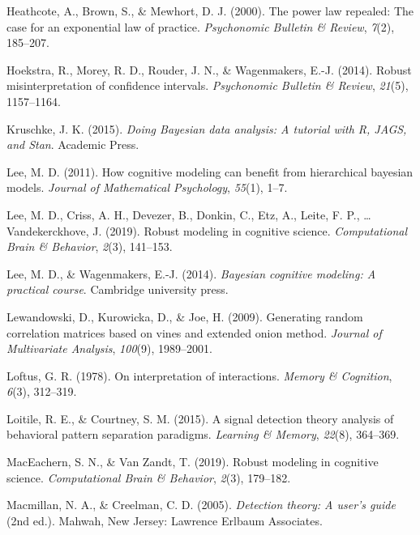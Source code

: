 \documentclass[
  english,
  ,man,floatsintext]{apa6}
\begin{document}
\leavevmode\hypertarget{ref-heathcote2000power}{}%
Heathcote, A., Brown, S., \& Mewhort, D. J. (2000). The power law repealed: The case for an exponential law of practice. \emph{Psychonomic Bulletin \& Review}, \emph{7}(2), 185--207.

\leavevmode\hypertarget{ref-HoekstraEtAl2014}{}%
Hoekstra, R., Morey, R. D., Rouder, J. N., \& Wagenmakers, E.-J. (2014). Robust misinterpretation of confidence intervals. \emph{Psychonomic Bulletin \& Review}, \emph{21}(5), 1157--1164.

\leavevmode\hypertarget{ref-Kruschke2015}{}%
Kruschke, J. K. (2015). \emph{Doing Bayesian data analysis: A tutorial with R, JAGS, and Stan}. Academic Press.

\leavevmode\hypertarget{ref-lee2011cognitive}{}%
Lee, M. D. (2011). How cognitive modeling can benefit from hierarchical bayesian models. \emph{Journal of Mathematical Psychology}, \emph{55}(1), 1--7.

\leavevmode\hypertarget{ref-LeeEtAl2019}{}%
Lee, M. D., Criss, A. H., Devezer, B., Donkin, C., Etz, A., Leite, F. P., \ldots{} Vandekerckhove, J. (2019). Robust modeling in cognitive science. \emph{Computational Brain \& Behavior}, \emph{2}(3), 141--153.

\leavevmode\hypertarget{ref-lee2014bayesian}{}%
Lee, M. D., \& Wagenmakers, E.-J. (2014). \emph{Bayesian cognitive modeling: A practical course}. Cambridge university press.

\leavevmode\hypertarget{ref-lewandowski2009generating}{}%
Lewandowski, D., Kurowicka, D., \& Joe, H. (2009). Generating random correlation matrices based on vines and extended onion method. \emph{Journal of Multivariate Analysis}, \emph{100}(9), 1989--2001.

\leavevmode\hypertarget{ref-Loftus1978}{}%
Loftus, G. R. (1978). On interpretation of interactions. \emph{Memory \& Cognition}, \emph{6}(3), 312--319.

\leavevmode\hypertarget{ref-LoitileAndCourtney2015}{}%
Loitile, R. E., \& Courtney, S. M. (2015). A signal detection theory analysis of behavioral pattern separation paradigms. \emph{Learning \& Memory}, \emph{22}(8), 364--369.

\leavevmode\hypertarget{ref-MacEachernAndVanZandt2019}{}%
MacEachern, S. N., \& Van Zandt, T. (2019). Robust modeling in cognitive science. \emph{Computational Brain \& Behavior}, \emph{2}(3), 179--182.

\leavevmode\hypertarget{ref-MacmillanAndCreelman2005}{}%
Macmillan, N. A., \& Creelman, C. D. (2005). \emph{Detection theory: A user's guide} (2nd ed.). Mahwah, New Jersey: Lawrence Erlbaum Associates.
\end{document}
